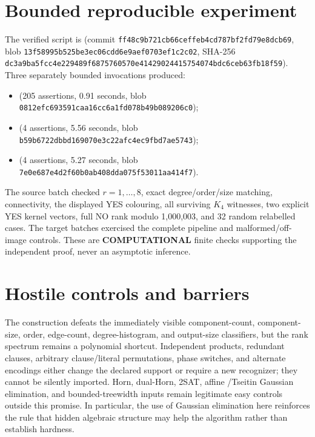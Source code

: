 \documentclass[11pt]{article}
\newcommand{\COMP}{\textbf{COMPUTATIONAL}}
\begin{document}
\section{Bounded reproducible experiment}
The verified script is
(commit \texttt{ff48c9b721cb66ceffeb4cd787bf2fd79e8dcb69}, blob
\texttt{13f58995b525be3ec06cdd6e9aef0703ef1c2c02}, SHA-256
\texttt{dc3a9ba5fcc4e229489f6875760570e41429024415754074bdc6ceb63fb18f59}).
Three separately bounded invocations produced:
\begin{itemize}
\item {}
  (205 assertions, 0.91 seconds, blob
  \texttt{0812efc693591caa16cc6a1fd078b49b089206c0});
\item {}
  (4 assertions, 5.56 seconds, blob
  \texttt{b59b6722dbbd169070e3c22afc4ec9fbd7ae5743});
\item {}
  (4 assertions, 5.27 seconds, blob
  \texttt{7e0e687e4d2f60b0ab408dda075f53011aa414f7}).
\end{itemize}
The source batch checked $r=1,\ldots,8$, exact degree/order/size matching,
connectivity, the displayed YES colouring, all surviving $K_4$ witnesses,
two explicit YES kernel vectors, full NO rank modulo 1,000,003, and 32 random
relabelled cases.  The target batches exercised the complete pipeline and
malformed/off-image controls.  These are \COMP{} finite checks supporting the
independent proof, never an asymptotic inference.

\section{Hostile controls and barriers}
The construction defeats the immediately visible component-count, component-
size, order, edge-count, degree-histogram, and output-size classifiers, but the
rank spectrum remains a polynomial shortcut.  Independent products,
redundant clauses, arbitrary clause/literal permutations, phase switches, and
alternate encodings either change the declared support or require a new
recognizer; they cannot be silently imported.  Horn, dual-Horn, 2SAT, affine
/Tseitin Gaussian elimination, and bounded-treewidth inputs remain legitimate
easy controls outside this promise.  In particular, the use of Gaussian
elimination here reinforces the rule that hidden algebraic structure may help
the algorithm rather than establish hardness.
\end{document}
